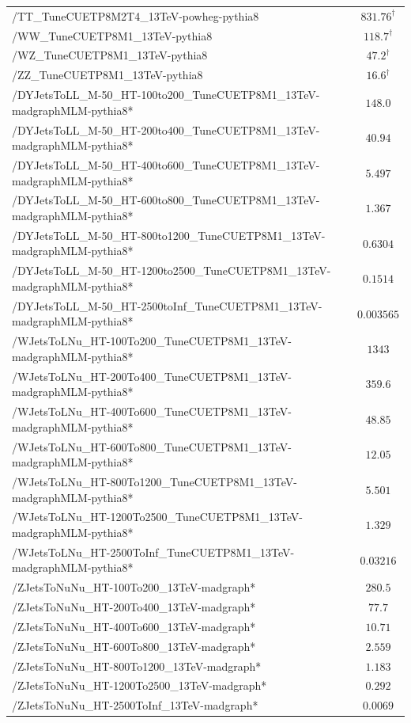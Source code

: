 {\begin{table}[htbp]
\begin{center}
\begin{tabular}{|l|c|}
/TT\_TuneCUETP8M2T4\_13TeV-powheg-pythia8 & $831.76^\dag$\\
/WW\_TuneCUETP8M1\_13TeV-pythia8 & $118.7^\dag$\\
/WZ\_TuneCUETP8M1\_13TeV-pythia8 & $47.2^\dag$\\
/ZZ\_TuneCUETP8M1\_13TeV-pythia8 & $16.6^\dag$\\
/DYJetsToLL\_M-50\_HT-100to200\_TuneCUETP8M1\_13TeV-madgraphMLM-pythia8* & $148.0$\\
/DYJetsToLL\_M-50\_HT-200to400\_TuneCUETP8M1\_13TeV-madgraphMLM-pythia8* & $40.94$\\
/DYJetsToLL\_M-50\_HT-400to600\_TuneCUETP8M1\_13TeV-madgraphMLM-pythia8* & $5.497$\\
/DYJetsToLL\_M-50\_HT-600to800\_TuneCUETP8M1\_13TeV-madgraphMLM-pythia8* & $1.367$\\
/DYJetsToLL\_M-50\_HT-800to1200\_TuneCUETP8M1\_13TeV-madgraphMLM-pythia8* & $0.6304$\\
/DYJetsToLL\_M-50\_HT-1200to2500\_TuneCUETP8M1\_13TeV-madgraphMLM-pythia8* & $0.1514$\\
/DYJetsToLL\_M-50\_HT-2500toInf\_TuneCUETP8M1\_13TeV-madgraphMLM-pythia8* & $0.003565$\\
/WJetsToLNu\_HT-100To200\_TuneCUETP8M1\_13TeV-madgraphMLM-pythia8* & $1343$\\
/WJetsToLNu\_HT-200To400\_TuneCUETP8M1\_13TeV-madgraphMLM-pythia8* & $359.6$\\
/WJetsToLNu\_HT-400To600\_TuneCUETP8M1\_13TeV-madgraphMLM-pythia8* & $48.85$\\
/WJetsToLNu\_HT-600To800\_TuneCUETP8M1\_13TeV-madgraphMLM-pythia8* & $12.05$ \\
/WJetsToLNu\_HT-800To1200\_TuneCUETP8M1\_13TeV-madgraphMLM-pythia8* & $5.501$ \\
/WJetsToLNu\_HT-1200To2500\_TuneCUETP8M1\_13TeV-madgraphMLM-pythia8* & $1.329$ \\
/WJetsToLNu\_HT-2500ToInf\_TuneCUETP8M1\_13TeV-madgraphMLM-pythia8* & $0.03216$ \\
/ZJetsToNuNu\_HT-100To200\_13TeV-madgraph* & $280.5$ \\
/ZJetsToNuNu\_HT-200To400\_13TeV-madgraph* & $77.7$\\
/ZJetsToNuNu\_HT-400To600\_13TeV-madgraph* & $10.71$\\
/ZJetsToNuNu\_HT-600To800\_13TeV-madgraph* & $2.559$\\ 
/ZJetsToNuNu\_HT-800To1200\_13TeV-madgraph* & $1.183$\\
/ZJetsToNuNu\_HT-1200To2500\_13TeV-madgraph* & $0.292$\\
/ZJetsToNuNu\_HT-2500ToInf\_13TeV-madgraph* & $0.0069$ \\
  \hline
  \end{tabular}
  \end{center}
\end{table}

}

